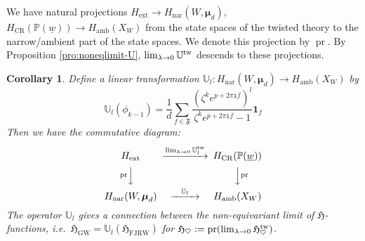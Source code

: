 \documentclass[11pt]{amsart}
\newtheorem{cor}[thm]{Corollary} %
\theoremstyle{definition} %
\theoremstyle{remark} %
\newcommand{\CC}{\mathbb C}
\newcommand{\PP}{\mathbb P}
\newcommand{\UU}{\mathbb U}
\newcommand{\nar}{\operatorname{nar}}
\newcommand{\la}{\lambda}
\newcommand{\tw}{{\rm tw}}
\def\GW{\operatorname{\text{GW}}}
\def\CR{\operatorname{\text{CR}}}
\def\ol{\overline}
\def\fracp#1{\left\langle #1 \right\rangle}
\newcommand{\bmu}{\boldsymbol{\mu}}
\newcommand{\frF}{\mathfrak{F}}
\newcommand{\unit}{\boldsymbol{1}}
\newcommand{\Nar}{\operatorname{\mathsf{Nar}}}
\newcommand{\amb}{\operatorname{amb}}
\newcommand{\ext}{{\operatorname{ext}}}
\newcommand{\FJRW}{{\operatorname{FJRW}}}
\renewcommand{\GW}{{\operatorname{GW}}}
\renewcommand{\CR}{{\operatorname{CR}}}
\newcommand{\pr}{\operatorname{pr}}
\newcommand{\ov}{\overline}
\newcommand{\iu}{\mathtt{i}}
\newcommand{\Hf}{{\mathfrak{H}}}
\newcommand{\uw}{\underline{w}}
\begin{document}
We have natural projections  
$H_{\ext} \to H_{\nar}(W,\bmu_d)$, 
$H_\CR(\PP(\uw)) \to H_{\amb}(X_W)$ 
from the state spaces of the twisted theory 
to the narrow/ambient part of the state spaces. 
We denote this projection by $\pr$. 
By Proposition \ref{pro:noneqlimit-U}, 
$\lim_{\lambda \to 0}\UU^\tw$ descends to these 
projections. 
\begin{cor} 
\label{cor:Udescends}
Define a linear transformation $\UU_l \colon H_{\nar}(W,\bmu_d) 
\to H_{\amb}(X_W)$ by 
\begin{equation} 
\label{eq:Unarrow} 
\UU_l (\phi_{k-1}) = \frac{1}{d} \sum_{f \in \frF}   
\frac{\left(\zeta^{k}e^{p+2\pi\iu\ov{f}}\right)^l}
{{\zeta^k e^{p+2\pi\iu \ov{f}}-1}} \unit_f
\end{equation} 
Then we have the commutative diagram: 
\begin{equation*} 
\begin{CD} 
H_\ext @>{\lim_{\lambda\to 0} \UU^\tw_l}>> H_\CR(\PP(\uw)) \\ 
@V{\pr} VV @VV{\pr}V \\ 
H_{\nar}(W,\bmu_d) @>{\UU_l}>> H_{\amb}(X_W) 
\end{CD} 
\end{equation*} 
The operator $\UU_l$ gives a connection between the non-equivariant 
limit of $\Hf$-functions, i.e.\ 
$\Hf_{\GW} = \UU_l(\Hf_{\FJRW})$ for 
$\Hf_{\heartsuit} := \pr (\lim_{\lambda \to 0} \Hf^\tw_{\heartsuit})$. 
\end{cor} 




\end{document}
